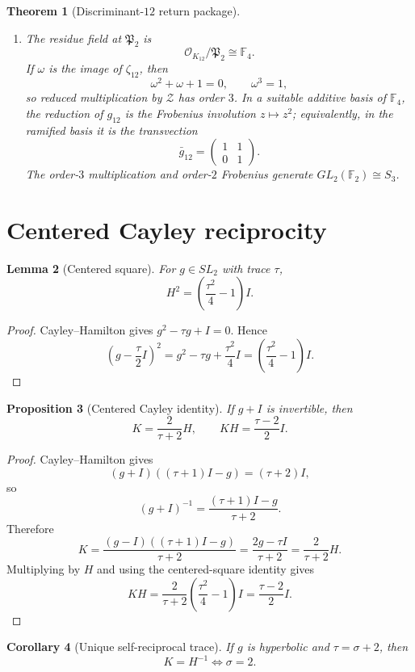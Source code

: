 \documentclass[11pt]{article}
\newtheorem{theorem}{Theorem}[section]
\newtheorem{proposition}[theorem]{Proposition}
\newtheorem{corollary}[theorem]{Corollary}
\newtheorem{lemma}[theorem]{Lemma}
\theoremstyle{definition}
\theoremstyle{remark}
\newcommand{\F}{\mathbb F}
\newcommand{\OO}{\mathcal O}
\begin{document}
\begin{theorem}[Discriminant-$12$ return package]
\begin{enumerate}[label=(\roman*)]
\item The residue field at $\mathfrak P_2$ is
\[
\OO_{K_{12}}/\mathfrak P_2\cong\F_4.
\]
If $\omega$ is the image of $\zeta_{12}$, then
\[
\omega^2+\omega+1=0,
\qquad
\omega^3=1,
\]
so reduced multiplication by $\mathcal Z$ has order $3$.  In a suitable
additive basis of $\F_4$, the reduction of $g_{12}$ is the Frobenius
involution $z\mapsto z^2$; equivalently, in the ramified basis it is the
transvection
\[
\bar g_{12}=\begin{pmatrix}1&1\\0&1\end{pmatrix}.
\]
The order-$3$ multiplication and order-$2$ Frobenius generate
$GL_2(\F_2)\cong S_3$.
\end{enumerate}
\end{theorem}

\section{Centered Cayley reciprocity}

\begin{lemma}[Centered square]
For $g\in SL_2$ with trace $\tau$,
\[
H^2=\left(\frac{\tau^2}{4}-1\right)I.
\]
\end{lemma}

\begin{proof}
Cayley--Hamilton gives $g^2-\tau g+I=0$.  Hence
\[
\left(g-\frac\tau2I\right)^2
=g^2-\tau g+\frac{\tau^2}{4}I
=\left(\frac{\tau^2}{4}-1\right)I.
\]
\end{proof}

\begin{proposition}[Centered Cayley identity]
If $g+I$ is invertible, then
\[
K=\frac{2}{\tau+2}H,
\qquad
KH=\frac{\tau-2}{2}I.
\]
\end{proposition}

\begin{proof}
Cayley--Hamilton gives
\[
(g+I)((\tau+1)I-g)=(\tau+2)I,
\]
so
\[
(g+I)^{-1}=\frac{(\tau+1)I-g}{\tau+2}.
\]
Therefore
\[
K=\frac{(g-I)((\tau+1)I-g)}{\tau+2}
=\frac{2g-\tau I}{\tau+2}
=\frac{2}{\tau+2}H.
\]
Multiplying by $H$ and using the centered-square identity gives
\[
KH=\frac{2}{\tau+2}
\left(\frac{\tau^2}{4}-1\right)I
=\frac{\tau-2}{2}I.
\]
\end{proof}

\begin{corollary}[Unique self-reciprocal trace]
If $g$ is hyperbolic and $\tau=\sigma+2$, then
\[
K=H^{-1}\iff\sigma=2.
\]
\end{corollary}
\end{document}
